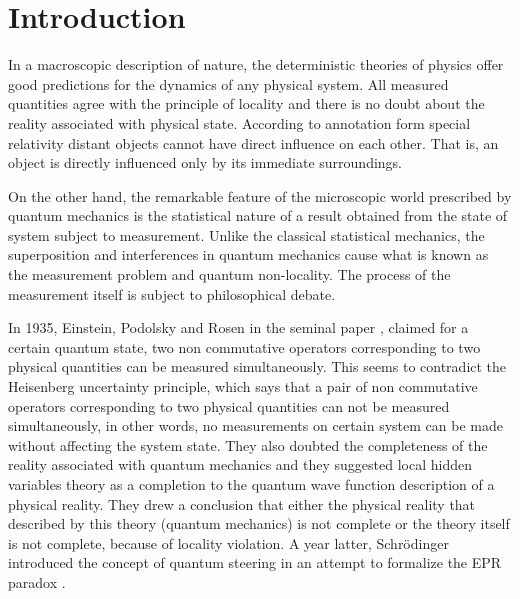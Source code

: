 \chapter{Introduction}
%

In a macroscopic description of nature, the deterministic theories of physics offer good predictions for the dynamics of any physical system. All measured quantities agree with the principle of locality and there is no doubt about the reality associated with physical state. According to annotation form special relativity distant objects cannot have direct influence on each other. That is, an object is directly influenced only by its immediate surroundings.

On the other hand, the remarkable feature of the microscopic world prescribed by quantum mechanics is the statistical nature of a result obtained from the state of system subject to measurement. Unlike the classical statistical mechanics, the superposition and interferences in quantum mechanics cause what is known as the measurement problem and  quantum non-locality.
The process of the measurement itself is subject to philosophical debate.

In 1935, Einstein, Podolsky and Rosen in the seminal paper \citep*{EPR}, claimed for a certain quantum state, two non commutative  operators corresponding to two physical quantities can be measured simultaneously.
This seems to contradict the Heisenberg uncertainty principle, which says that a pair of non commutative operators corresponding to two physical quantities  can not be measured simultaneously, in other words, no measurements on certain system can be made without affecting the system state. They also doubted the completeness of the reality associated with quantum mechanics and they suggested local hidden variables theory as a completion to the quantum wave function description of a physical reality.
They drew a conclusion that either the physical reality that described by this theory (quantum mechanics) is not complete or the theory itself is not complete, because of locality violation. %
A year latter, Schrödinger introduced the concept of quantum steering in an attempt to formalize the EPR paradox \citep*{schrodinger1935discussion}.


